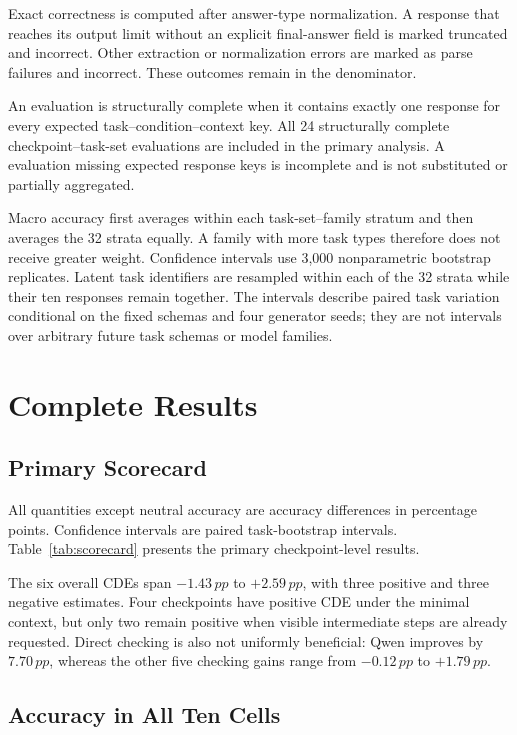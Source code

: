 \documentclass[sigconf,anonymous,review]{acmart}
\newcommand{\pp}{\,pp}
\begin{document}
Exact correctness is computed after answer-type normalization. A response that
reaches its output limit without an explicit final-answer field is marked
truncated and incorrect. Other extraction or normalization errors are marked
as parse failures and incorrect. These outcomes remain in the denominator.

An evaluation is structurally complete when it contains exactly one response
for every expected task--condition--context key. All 24 structurally complete
checkpoint--task-set evaluations are included in the primary analysis. A
evaluation missing expected response keys is incomplete and is not substituted
or partially aggregated.

Macro accuracy first averages within each task-set--family stratum and then
averages the 32 strata equally. A family with more task types therefore does
not receive greater weight. Confidence intervals use 3,000 nonparametric
bootstrap replicates. Latent task identifiers are resampled within each of the
32 strata while their ten responses remain together. The intervals describe
paired task variation conditional on the fixed schemas and four generator
seeds; they are not intervals over arbitrary future task schemas or model
families.

\section{Complete Results}

\subsection{Primary Scorecard}

All quantities except neutral accuracy are accuracy differences in percentage
points. Confidence intervals are paired task-bootstrap intervals.
Table~\ref{tab:scorecard} presents the primary checkpoint-level results.



The six overall CDEs span $-1.43\pp$ to $+2.59\pp$, with three positive and
three negative estimates. Four checkpoints have positive CDE under the minimal
context, but only two remain positive when visible intermediate steps are
already requested. Direct checking is also not uniformly beneficial: Qwen
improves by $7.70\pp$, whereas the other five checking gains range from
$-0.12\pp$ to $+1.79\pp$.

\subsection{Accuracy in All Ten Cells}
\end{document}
